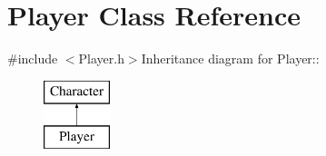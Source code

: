 \hypertarget{classPlayer}{
\section{Player Class Reference}
\label{classPlayer}
}


{\ttfamily \#include $<$Player.h$>$}Inheritance diagram for Player::\begin{figure}[H]
\begin{center}
\leavevmode
\includegraphics[height=2cm]{classPlayer}
\end{center}
\end{figure}

